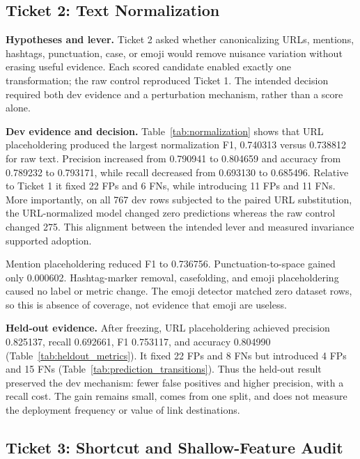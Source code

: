 \documentclass[conference]{IEEEtran}
\begin{document}
\subsection{Ticket 2: Text Normalization}

\textbf{Hypotheses and lever.} Ticket 2 asked whether canonicalizing URLs, mentions, hashtags, punctuation, case, or emoji would remove nuisance variation without erasing useful evidence. Each scored candidate enabled exactly one transformation; the raw control reproduced Ticket 1. The intended decision required both dev evidence and a perturbation mechanism, rather than a score alone.



\textbf{Dev evidence and decision.} Table~\ref{tab:normalization} shows that URL placeholdering produced the largest normalization F1, 0.740313 versus 0.738812 for raw text. Precision increased from 0.790941 to 0.804659 and accuracy from 0.789232 to 0.793171, while recall decreased from 0.693130 to 0.685496. Relative to Ticket 1 it fixed 22 FPs and 6 FNs, while introducing 11 FPs and 11 FNs. More importantly, on all 767 dev rows subjected to the paired URL substitution, the URL-normalized model changed zero predictions whereas the raw control changed 275. This alignment between the intended lever and measured invariance supported adoption.

Mention placeholdering reduced F1 to 0.736756. Punctuation-to-space gained only 0.000602. Hashtag-marker removal, casefolding, and emoji placeholdering caused no label or metric change. The emoji detector matched zero dataset rows, so this is absence of coverage, not evidence that emoji are useless.

\textbf{Held-out evidence.} After freezing, URL placeholdering achieved precision 0.825137, recall 0.692661, F1 0.753117, and accuracy 0.804990 (Table~\ref{tab:heldout_metrics}). It fixed 22 FPs and 8 FNs but introduced 4 FPs and 15 FNs (Table~\ref{tab:prediction_transitions}). Thus the held-out result preserved the dev mechanism: fewer false positives and higher precision, with a recall cost. The gain remains small, comes from one split, and does not measure the deployment frequency or value of link destinations.

\subsection{Ticket 3: Shortcut and Shallow-Feature Audit}
\end{document}
